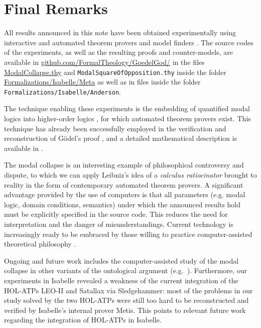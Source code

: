 \documentclass{birkmult}
\theoremstyle{definition}
\theoremstyle{remark}
\numberwithin{equation}{section}
\begin{document}
\section{Final Remarks}

\sloppy All results announced in this note have been 
obtained experimentally using interactive and 
automated theorem provers and model finders
\cite{LEO,Satallax,Isabelle,Coq,Nitpick}.  
The source codes of the experiments, 
as well as the resulting proofs and counter-models, 
are available in
\url{github.com/FormalTheology/GoedelGod/}
in the files \url{ModalCollapse.thy} and \texttt{ModalSquareOfOpposition.thy} inside the folder \url{Formalizations/Isabelle/Meta} as well as in files inside the folder \texttt{Formalizations/Isabelle/Anderson}.

The technique enabling these experiments is the embedding of 
quantified modal logics into higher-order logics 
\cite{J23,B9,C36}, for which automated theorem provers exist. 
This technique has already been successfully employed in the 
verification and reconstruction of G\"odel's proof 
\cite{J28,J30,W50,J29}, and a detailed 
mathematical description is available in \cite{C40}.

The modal collapse is an interesting example of philosophical 
controversy and dispute, to which we can apply Leibniz's idea 
of a \emph{calculus ratiocinator} brought to reality in the 
form of contemporary automated theorem provers. 
A significant advantage provided by the use of computers is 
that all parameters (e.g. modal logic, domain conditions, 
semantics) under which the announced results hold must be 
explicitly specified in the source code. This reduces the need 
for interpretation and the danger of misunderstandings. 
Current technology is increasingly ready to be embraced by 
those willing to practice computer-assisted theoretical 
philosophy \cite{oppenheimera11,rushby13}.

Ongoing and future work includes the computer-assisted 
study of the modal collapse in
other variants of the ontological argument (e.g.~\cite{bjordal99,fuhrmann05:_exist_notwen}). Furthermore, our experiments in Isabelle revealed a weakness of the current integration of the HOL-ATPs LEO-II and Satallax via Sledgehammer: most of the problems in our study solved by the two HOL-ATPs were still too hard to be reconstructed and verified by Isabelle's internal prover Metis. This points to relevant future work regarding the integration of HOL-ATPs in Isabelle.
 
\end{document}
